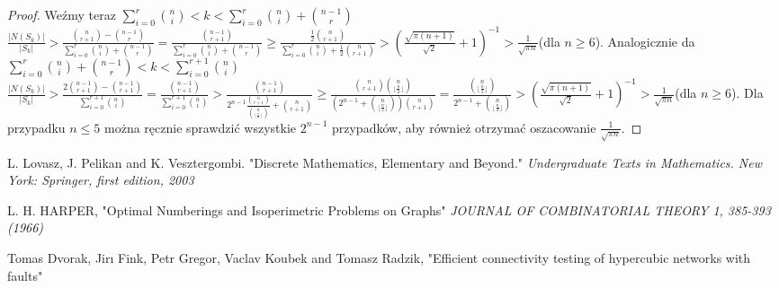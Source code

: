 \documentclass{pracamgr}
\begin{document}
\begin{proof}
    Weźmy teraz $\sum_{i=0}^{r}{n\choose i}<k<\sum_{i=0}^{r}{n\choose i}+{n-1 \choose r}$\newline
    $\frac{|N(S_k)|}{|S_k|}>\frac{{n\choose r+1}-{n-1\choose r}}{\sum_{i=0}^{r}{n\choose i}+{n-1 \choose r}}=
    \frac{{n-1\choose r+1}}{\sum_{i=0}^{r}{n\choose i}+{n-1 \choose r}}\ge
    \frac{\frac{1}{2}{n \choose r+1}}{\sum_{i=0}^{r}{n\choose i}+\frac{1}{2}{n \choose r+1}}>
    \left(\frac{\sqrt{\pi (n+1)}}{\sqrt{2}}+1\right)^{-1}>\frac{1}{\sqrt{\pi n}}$(dla $n\ge 6$).\newline
    Analogicznie da $\sum_{i=0}^{r}{n\choose i}+{n-1 \choose r}<k<\sum_{i=0}^{r+1}{n\choose i}$\newline
    $\frac{|N(S_k)|}{|S_k|}>\frac{2{n-1\choose r+1}-{n-1\choose r+1}}{\sum_{i=0}^{r+1}{n\choose i}}=
    \frac{{n-1\choose r+1}}{\sum_{i=0}^{r+1}{n\choose i}}>
    \frac{{n-1\choose r+1}}{2^{n-1}\frac{{n\choose r+1}}{{n\choose\lfloor\frac{n}{2}\rfloor}}+{n\choose r+1}}\ge
    \frac{{n\choose r+1}{n\choose\lfloor\frac{n}{2}\rfloor}}{(2^{n-1}+{n\choose\lfloor\frac{n}{2}\rfloor}){n\choose r+1}}=
    \frac{{n\choose\lfloor\frac{n}{2}\rfloor}}{2^{n-1}+{n\choose\lfloor\frac{n}{2}\rfloor}}>
    \left(\frac{\sqrt{\pi (n+1)}}{\sqrt{2}}+1\right)^{-1}>\frac{1}{\sqrt{\pi n}}$(dla $n\ge 6$).\newline
    Dla przypadku $n\le5$ można ręcznie sprawdzić wszystkie $2^{n-1}$ przypadków, aby również otrzymać oszacowanie $\frac{1}{\sqrt{\pi n}}$.
   \end{proof}


    


  
\begin{thebibliography}{99}%

   L. Lovasz, J. Pelikan and K. Vesztergombi.
   "Discrete Mathematics, Elementary and Beyond."
   \textit{Undergraduate Texts in Mathematics. New York: Springer, first edition, 2003}   


   L. H. HARPER,
   "Optimal Numberings and Isoperimetric Problems on Graphs"
   \textit{JOURNAL OF COMBINATORIAL THEORY 1, 385-393 (1966)}
   
    Tomas Dvorak, Jirı Fink, Petr Gregor, Vaclav Koubek and Tomasz Radzik,
   "Efficient connectivity testing of hypercubic networks with faults"
   
   
\end{thebibliography}
\end{document}
